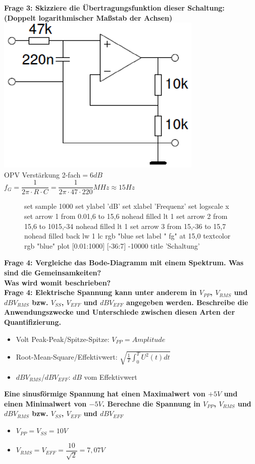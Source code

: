 \documentclass[11pt,a4paper]{scrartcl}
\begin{document}
\textbf{Frage 3: Skizziere die Übertragungsfunktion dieser Schaltung:\\
(Doppelt logarithmischer Maßstab der Achsen)}\\
\includegraphics{Schaltung_2.png}\\
OPV Verstärkung 2-fach$=6dB$\\
$f_G=\dfrac{1}{2 \pi \cdot R \cdot C}=\dfrac{1}{2\pi\cdot 47 \cdot 220}MHz\approx 15Hz$\\
\begin{figure}[H]
	\centering
	\begin{gnuplot}[terminal=pdf]
			set sample 1000
			set ylabel 'dB'
			set xlabel 'Frequenz'
			set logscale x
			set arrow 1 from 0.01,6 to 15,6 nohead filled lt 1
			set arrow 2 from 15,6 to 1015,-34 nohead filled lt 1
			set arrow 3 from 15,-36 to 15,7 nohead  filled back lw 1 lc rgb "blue
			set label " fg" at 15,0 textcolor rgb "blue"
			plot [0.01:1000] [-36:7] -10000 title 'Schaltung'
	\end{gnuplot}
\end{figure}
\newpage
\textbf{Frage 4: Vergleiche das Bode-Diagramm mit einem Spektrum. Was sind die Gemeinsamkeiten?}\\
\textbf{Was wird womit beschrieben?}\\


\textbf{Frage 4: Elektrische Spannung kann unter anderem in $V_{PP}$, $V_{RMS}$ und $dBV_{RMS}$ bzw. $V_{SS}$, $V_{EFF}$ und $dBV_{EFF}$ angegeben werden. Beschreibe die Anwendungszwecke und Unterschiede zwischen diesen Arten der Quantifizierung.}\\
\begin{itemize}
	\item Volt Peak-Peak/Spitze-Spitze: $V_{PP}=Amplitude$
	\item Root-Mean-Square/Effektivwert: $\sqrt{\frac{1}{T}\int_0^TU^2(t)dt}$
	\item $dBV_{RMS}$/$dBV_{EFF}$: $dB$ vom Effektivwert
\end{itemize}
\textbf{Eine sinusförmige Spannung hat einen Maximalwert von $+5V$ und einen
Minimalwert von $-5V$. Berechne die Spannung in $V_{PP}$, $V_{RMS}$ und $dBV_{RMS}$ bzw. $V_{SS}$, $V_{EFF}$ und $dBV_{EFF}$}\\
\begin{itemize}
	\item $V_{PP}=V_{SS}=10V$
	\item $V_{RMS}=V_{EFF}=\dfrac{10}{\sqrt{2}}=7,07V$
\end{itemize}
\end{document}
